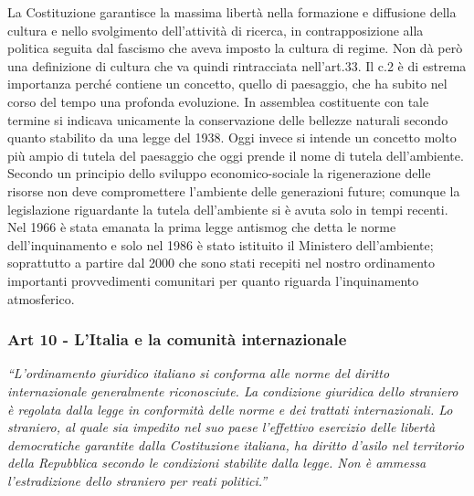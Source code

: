 \documentclass{report}
\begin{document}
La Costituzione garantisce la massima libertà nella formazione e diffusione della cultura e nello svolgimento
dell’attività di ricerca, in contrapposizione alla politica seguita dal fascismo che aveva imposto la cultura di
regime. Non dà però una definizione di cultura che va quindi rintracciata nell’art.33.
Il c.2 è di estrema importanza perché contiene un concetto, quello di paesaggio, che ha subito nel corso del tempo una
profonda evoluzione. In assemblea costituente con tale termine si indicava unicamente la conservazione delle
bellezze naturali secondo quanto stabilito da una legge del 1938.
Oggi invece si intende un concetto molto più ampio di tutela del paesaggio che oggi prende il nome di tutela
dell’ambiente. Secondo un principio dello sviluppo economico-sociale la rigenerazione delle risorse non deve
compromettere l’ambiente delle generazioni future; comunque la legislazione riguardante la tutela dell’ambiente
si è avuta solo in tempi recenti.
Nel 1966 è stata emanata la prima legge antismog che detta le norme dell’inquinamento e solo nel 1986 è stato istituito
il Ministero dell’ambiente; soprattutto a partire dal 2000 che sono stati recepiti nel nostro ordinamento
importanti provvedimenti comunitari per quanto riguarda l’inquinamento atmosferico.


\subsubsection{Art 10 - L'Italia e la comunità internazionale}

\textit{“L'ordinamento giuridico italiano si conforma alle norme del diritto internazionale generalmente riconosciute.
La condizione giuridica dello straniero è regolata dalla legge in conformità delle norme e dei trattati
internazionali.
Lo straniero, al quale sia impedito nel suo paese l'effettivo esercizio delle libertà democratiche garantite dalla
Costituzione italiana, ha diritto d'asilo nel territorio della Repubblica secondo le condizioni stabilite dalla
legge.
Non è ammessa l'estradizione dello straniero per reati politici.”}

\end{document}
